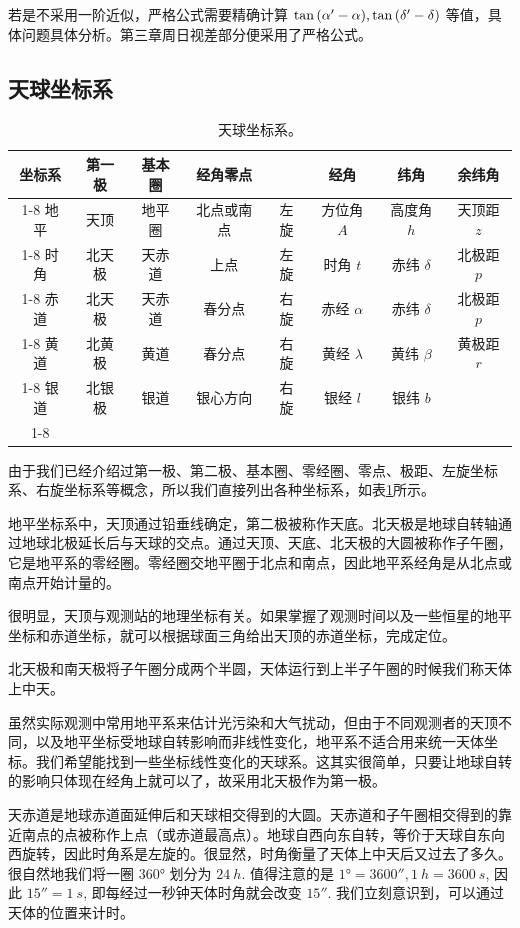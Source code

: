 \documentclass[UTF8, 12pt, a4paper, oneside, onecolumn, fontset=none]{ctexart}
\begin{document}
若是不采用一阶近似，严格公式需要精确计算 $\tan{\mleft(\alpha'-\alpha\mright)},\tan{\mleft(\delta'-\delta\mright)}$ 等值，具体问题具体分析。第三章周日视差部分便采用了严格公式。

\subsection{天球坐标系}
\begin{table}[htbp]
\centering
\caption{天球坐标系。}
\begin{tabular}{c c c c c c c c}
\hline
坐标系 & 第一极 & 基本圈 & 经角零点 &  & 经角 & 纬角 & 余纬角\\
\cline{1-8}
地平 & 天顶 & 地平圈 & 北点或南点 & 左旋 & 方位角 $A$ & 高度角 $h$ & 天顶距 $z$\\
\cline{1-8}
时角 & 北天极 & 天赤道 & 上点 & 左旋 & 时角 $t$ & 赤纬 $\delta$ & 北极距 $p$\\
\cline{1-8}
赤道 & 北天极 & 天赤道 & 春分点 & 右旋 & 赤经 $\alpha$ & 赤纬 $\delta$ & 北极距 $p$\\
\cline{1-8}
黄道 & 北黄极 & 黄道 & 春分点 & 右旋 & 黄经 $\lambda$ & 黄纬 $\beta$ & 黄极距 $r$\\
\cline{1-8}
银道 & 北银极 & 银道 & 银心方向 & 右旋 & 银经 $l$ & 银纬 $b$ & \\
\cline{1-8}
\end{tabular}
\label{天球坐标系。}
\end{table}

由于我们已经介绍过第一极、第二极、基本圈、零经圈、零点、极距、左旋坐标系、右旋坐标系等概念，所以我们直接列出各种坐标系，如表\ref{天球坐标系。}所示。

地平坐标系中，天顶通过铅垂线确定，第二极被称作天底。北天极是地球自转轴通过地球北极延长后与天球的交点。通过天顶、天底、北天极的大圆被称作子午圈，它是地平系的零经圈。零经圈交地平圈于北点和南点，因此地平系经角是从北点或南点开始计量的。

很明显，天顶与观测站的地理坐标有关。如果掌握了观测时间以及一些恒星的地平坐标和赤道坐标，就可以根据球面三角给出天顶的赤道坐标，完成定位。

北天极和南天极将子午圈分成两个半圆，天体运行到上半子午圈的时候我们称天体上中天。

虽然实际观测中常用地平系来估计光污染和大气扰动，但由于不同观测者的天顶不同，以及地平坐标受地球自转影响而非线性变化，地平系不适合用来统一天体坐标。我们希望能找到一些坐标线性变化的天球系。这其实很简单，只要让地球自转的影响只体现在经角上就可以了，故采用北天极作为第一极。

天赤道是地球赤道面延伸后和天球相交得到的大圆。天赤道和子午圈相交得到的靠近南点的点被称作上点（或赤道最高点）。地球自西向东自转，等价于天球自东向西旋转，因此时角系是左旋的。很显然，时角衡量了天体上中天后又过去了多久。很自然地我们将一圈 $\ang{360;;}$ 划分为 $\qty{24}{h}$. 值得注意的是 $\ang{1;;}=\ang{;; 3600},\qty{1}{h}=\qty{3600}{s}$, 因此 $\ang{;; 15}=\qty{1}{s}$, 即每经过一秒钟天体时角就会改变 $\ang{;; 15}$. 我们立刻意识到，可以通过天体的位置来计时。
\end{document}
